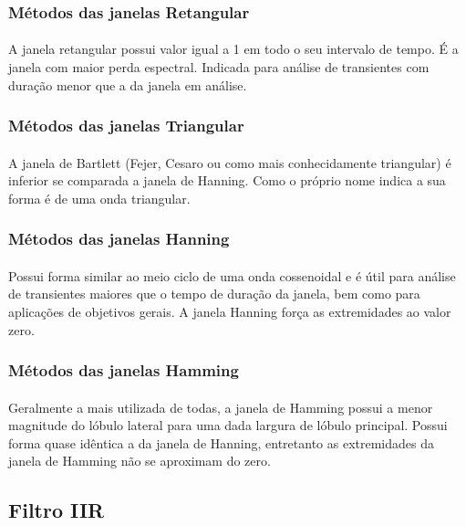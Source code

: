 \documentclass[12pt,fleqn]{article}
\begin{document}
\subsubsection{Métodos das janelas Retangular}
\paragraph{} A janela retangular possui valor igual a 1 em todo o seu intervalo de tempo. É a janela com maior perda espectral. Indicada para análise de transientes com duração menor que a da janela em análise.

\subsubsection{Métodos das janelas Triangular}
\paragraph{} A janela de Bartlett (Fejer, Cesaro ou como mais conhecidamente triangular) é inferior se comparada a janela de Hanning. Como o próprio nome indica a sua forma é de uma onda triangular.

\subsubsection{Métodos das janelas Hanning}
\paragraph{} Possui forma similar ao meio ciclo de uma onda cossenoidal e é útil para análise de transientes maiores que o tempo de duração da janela, bem como para aplicações de objetivos gerais. A janela Hanning força as extremidades ao valor zero.

\subsubsection{Métodos das janelas Hamming}
\paragraph{} Geralmente a mais utilizada de todas, a janela de Hamming possui a menor magnitude do lóbulo lateral para uma dada largura de lóbulo principal. Possui forma quase idêntica a da janela de Hanning, entretanto as extremidades da janela de Hamming não se aproximam do zero.

\subsection{Filtro IIR}
\end{document}
